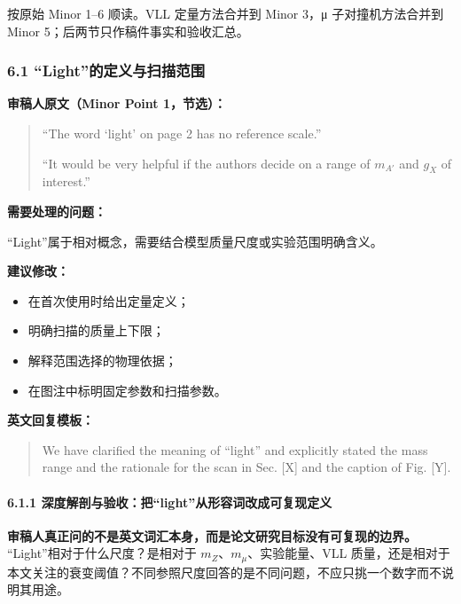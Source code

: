 \documentclass[
]{article}
\providecommand{\tightlist}{%
  \setlength{\itemsep}{0pt}\setlength{\parskip}{0pt}}
\begin{document}
按原始 Minor 1--6 顺读。VLL 定量方法合并到 Minor 3，μ 子对撞机方法合并到
Minor 5；后两节只作稿件事实和验收汇总。

\subsubsection{6.1
``Light''的定义与扫描范围}\label{lightux7684ux5b9aux4e49ux4e0eux626bux63cfux8303ux56f4}

\textbf{审稿人原文（Minor Point 1，节选）：}

\begin{quote}
``The word `light' on page 2 has no reference scale.''

``It would be very helpful if the authors decide on a range of
\(m_{A'}\) and \(g_X\) of interest.''
\end{quote}

\textbf{需要处理的问题：}

``Light''属于相对概念，需要结合模型质量尺度或实验范围明确含义。

\textbf{建议修改：}

\begin{itemize}
\tightlist
\item
  在首次使用时给出定量定义；
\item
  明确扫描的质量上下限；
\item
  解释范围选择的物理依据；
\item
  在图注中标明固定参数和扫描参数。
\end{itemize}

\textbf{英文回复模板：}

\begin{quote}
We have clarified the meaning of ``light'' and explicitly stated the
mass range and the rationale for the scan in Sec. {[}X{]} and the
caption of Fig. {[}Y{]}.
\end{quote}

\paragraph{6.1.1
深度解剖与验收：把``light''从形容词改成可复现定义}\label{ux6df1ux5ea6ux89e3ux5256ux4e0eux9a8cux6536ux628alightux4eceux5f62ux5bb9ux8bcdux6539ux6210ux53efux590dux73b0ux5b9aux4e49}

\textbf{审稿人真正问的不是英文词汇本身，而是论文研究目标没有可复现的边界。}
``Light''相对于什么尺度？是相对于 \(m_Z\)、\(m_\mu\)、实验能量、VLL
质量，还是相对于本文关注的衰变阈值？不同参照尺度回答的是不同问题，不应只挑一个数字而不说明其用途。
\end{document}
